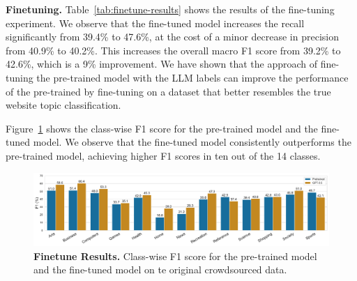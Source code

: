 \textbf{Finetuning.} Table~\ref{tab:finetune-results} shows the results of the fine-tuning experiment. We observe that the fine-tuned model increases the recall significantly from 39.4\% to 47.6\%, at the cost of a minor decrease in precision from 40.9\% to 40.2\%. This increases the overall macro F1 score from 39.2\% to 42.6\%, which is a 9\% improvement. We have shown that the approach of fine-tuning the pre-trained model with the LLM labels can improve the performance of the pre-trained by fine-tuning on a dataset that better resembles the true website topic classification.




Figure~\ref{fig:finetune-results} shows the class-wise F1 score for the pre-trained model and the fine-tuned model. We observe that the fine-tuned model consistently outperforms the pre-trained model, achieving higher F1 scores in ten out of the 14 classes.


\begin{figure}
    \centering
    \includegraphics[width=\textwidth]{./figures/exp2-mf1.pdf}
    \caption{\textbf{Finetune Results.} Class-wise F1 score for the pre-trained model and the fine-tuned model on te original crowdsourced data.}
    \label{fig:finetune-results}
\end{figure}
